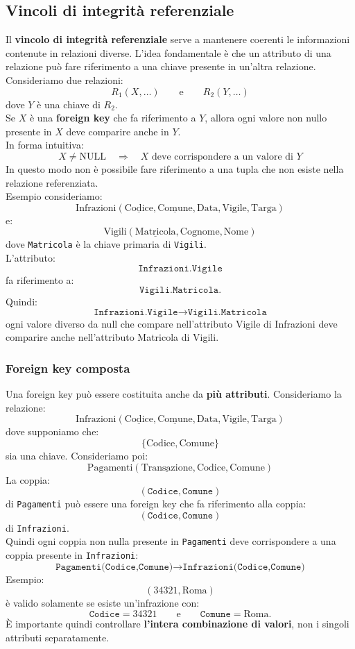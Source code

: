 \subsection{Vincoli di integrità referenziale}
Il \textbf{vincolo di integrità referenziale} serve a mantenere coerenti
le informazioni contenute in relazioni diverse.
L'idea fondamentale è che un attributo di una relazione può fare
riferimento a una chiave presente in un'altra relazione.
Consideriamo due relazioni:
\[
R_1(X,\ldots)
\qquad\text{e}\qquad
R_2(Y,\ldots)
\]
dove $Y$ è una chiave di $R_2$.\\
Se $X$ è una \textbf{foreign key} che fa riferimento a $Y$, allora ogni
valore non nullo presente in $X$ deve comparire anche in $Y$.\\
In forma intuitiva:
\[
\boxed{
X \neq \text{NULL}
\quad\Longrightarrow\quad
X \text{ deve corrispondere a un valore di } Y
}
\]
In questo modo non è possibile fare riferimento a una tupla che non
esiste nella relazione referenziata.\\
\textcolor{verdeEsempio}{Esempio} consideriamo:
\[
\text{Infrazioni}(
\underline{\text{Codice}},
\underline{\text{Comune}},
\text{Data},
\text{Vigile},
\text{Targa})
\]
e:
\[
\text{Vigili}(
\underline{\text{Matricola}},
\text{Cognome},
\text{Nome})
\]
dove \texttt{Matricola} è la chiave primaria di \texttt{Vigili}.\\
L'attributo:
\[
\texttt{Infrazioni.Vigile}
\]
fa riferimento a:
\[
\texttt{Vigili.Matricola}.
\]
Quindi:
\[
\boxed{
\texttt{Infrazioni.Vigile}
\rightarrow
\texttt{Vigili.Matricola}
}
\]
ogni valore diverso da null che compare nell'attributo Vigile di Infrazioni deve comparire anche nell'attributo Matricola di Vigili.

\subsubsection{Foreign key composta}
Una foreign key può essere costituita anche da \textbf{più attributi}.
Consideriamo la relazione:
\[
\text{Infrazioni}(
\underline{\text{Codice}},
\underline{\text{Comune}},
\text{Data},
\text{Vigile},
\text{Targa})
\]
dove supponiamo che:
\[
\{\text{Codice},\text{Comune}\}
\]
sia una chiave.
Consideriamo poi:
\[
\text{Pagamenti}(
\underline{\text{Transazione}},
\text{Codice},
\text{Comune})
\]
La coppia:
\[
(\texttt{Codice},\texttt{Comune})
\]
di \texttt{Pagamenti} può essere una foreign key che fa riferimento
alla coppia:
\[
(\texttt{Codice},\texttt{Comune})
\]
di \texttt{Infrazioni}.\\
Quindi ogni coppia non nulla presente in \texttt{Pagamenti} deve
corrispondere a una coppia presente in \texttt{Infrazioni}:
\[
\boxed{
\texttt{Pagamenti(Codice,Comune)}
\rightarrow
\texttt{Infrazioni(Codice,Comune)}
}
\]
\textcolor{verdeEsempio}{Esempio:}
\[
(34321,\text{Roma})
\]
è valido solamente se esiste un'infrazione con:
\[
\texttt{Codice}=34321
\qquad\text{e}\qquad
\texttt{Comune}=\text{Roma}.
\]
È importante quindi controllare \textbf{l'intera combinazione di valori},
non i singoli attributi separatamente.

